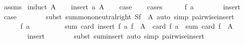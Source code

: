 \begin{isabellebody}
%
\isadelimproof
%
\endisadelimproof
%
\isatagproof
{}\isamarkupfalse%
\ assms\isanewline
{}\isamarkupfalse%
\ {\isacharparenleft}{\kern0pt}induct\ A{\isacharparenright}{\kern0pt}\isanewline
\ \ \isamarkupfalse%
\ {\isacharparenleft}{\kern0pt}insert\ a\ A{\isacharparenright}{\kern0pt}\isanewline
\ \ \isamarkupfalse%
\ {\isacharquery}{\kern0pt}case\isanewline
\ \ \isamarkupfalse%
\ cases\isanewline
\ \ \ \ \isamarkupfalse%
\ {\isachardoublequoteopen}f\ a\ {\isacharequal}{\kern0pt}\ {\isacharbraceleft}{\kern0pt}{\isacharbraceright}{\kern0pt}{\isachardoublequoteclose}\isanewline
\ \ \ \ \isamarkupfalse%
\ insert\ \isamarkupfalse%
\ {\isacharquery}{\kern0pt}case\isanewline
\ \ \ \ \ \ \isamarkupfalse%
\ {\isacharparenleft}{\kern0pt}subst\ sum{\isachardot}{\kern0pt}mono{\isacharunderscore}{\kern0pt}neutral{\isacharunderscore}{\kern0pt}right{\isacharbrackleft}{\kern0pt}\ S{\isacharequal}{\kern0pt}{\isachardoublequoteopen}f\ {\isacharbackquote}{\kern0pt}\ A{\isachardoublequoteclose}{\isacharbrackright}{\kern0pt}{\isacharparenright}{\kern0pt}\ {\isacharparenleft}{\kern0pt}auto\ simp{\isacharcolon}{\kern0pt}\ pairwise{\isacharunderscore}{\kern0pt}insert{\isacharparenright}{\kern0pt}\isanewline
\ \ \isamarkupfalse%
\isanewline
\ \ \ \ \isamarkupfalse%
\ {\isachardoublequoteopen}f\ a\ {\isasymnoteq}\ {\isacharbraceleft}{\kern0pt}{\isacharbraceright}{\kern0pt}{\isachardoublequoteclose}\isanewline
\ \ \ \ \isamarkupfalse%
\ \isamarkupfalse%
\ {\isachardoublequoteopen}sum\ card\ {\isacharparenleft}{\kern0pt}insert\ {\isacharparenleft}{\kern0pt}f\ a{\isacharparenright}{\kern0pt}\ {\isacharparenleft}{\kern0pt}f\ {\isacharbackquote}{\kern0pt}\ A{\isacharparenright}{\kern0pt}{\isacharparenright}{\kern0pt}\ {\isacharequal}{\kern0pt}\ card\ {\isacharparenleft}{\kern0pt}f\ a{\isacharparenright}{\kern0pt}\ {\isacharplus}{\kern0pt}\ sum\ card\ {\isacharparenleft}{\kern0pt}f\ {\isacharbackquote}{\kern0pt}\ A{\isacharparenright}{\kern0pt}{\isachardoublequoteclose}\isanewline
\ \ \ \ \ \ \isamarkupfalse%
\ insert\isanewline
\ \ \ \ \ \ \isamarkupfalse%
\ {\isacharparenleft}{\kern0pt}subst\ sum{\isachardot}{\kern0pt}insert{\isacharparenright}{\kern0pt}\ {\isacharparenleft}{\kern0pt}auto\ simp{\isacharcolon}{\kern0pt}\ pairwise{\isacharunderscore}{\kern0pt}insert{\isacharparenright}{\kern0pt}\isanewline
\ \ \ \ \isamarkupfalse%

\end{isabellebody}
